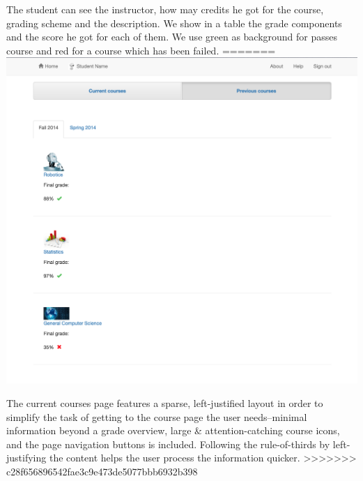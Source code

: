 The student can see the instructor, how may credits he got for the course, grading scheme and the description. We show in a table the grade components and the score he got for each of them. We use green as background for passes course and red for a course which has been failed.
=======
\includegraphics[width=\textwidth]{screenshots/PreviousCourses.png}

The current courses page features a sparse, left-justified layout in order to simplify the task of getting to the course page the user needs--minimal information beyond a grade overview, large \& attention-catching course icons, and the page navigation buttons is included. Following the rule-of-thirds by left-justifying the content helps the user process the information quicker.
>>>>>>> c28f656896542fae3c9e473de5077bbb6932b398
